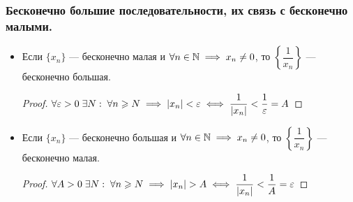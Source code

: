 \documentclass[12pt, a4paper]{article}
\begin{document}
	\subsubsection{Бесконечно большие последовательности, их связь с бесконечно малыми.}
	\begin{itemize}
		\item
		Если $\{x_n\}$ --- бесконечно малая и $\forall n \in \mathbb{N} \implies x_n \neq 0$, то $\left\{\dfrac{1}{x_n}\right\}$ --- бесконечно большая.
		\begin{proof}
			$\forall \varepsilon > 0 \; \exists N: \; \forall n \geqslant N \implies |x_n| < \varepsilon \iff \dfrac{1}{|x_n|} < \dfrac{1}{\varepsilon} = A$
		\end{proof}

		\item
		Если $\{x_n\}$ --- бесконечно большая и $\forall n \in \mathbb{N} \implies x_n \neq 0$, то $\left\{\dfrac{1}{x_n}\right\}$ --- бесконечно малая.
		\begin{proof}
			$\forall A > 0 \; \exists N: \; \forall n \geqslant N \implies |x_n| > A \iff \dfrac{1}{|x_n|} < \dfrac{1}{A} = \varepsilon$
		\end{proof}
	\end{itemize}
\end{document}
